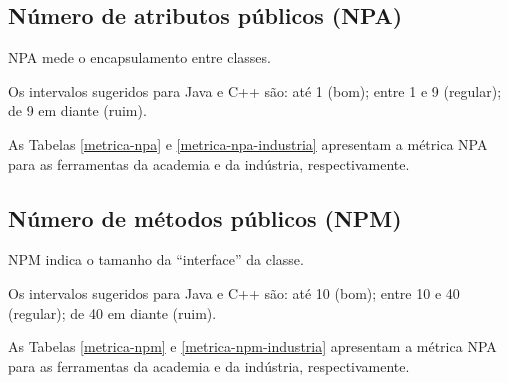 \subsection{Número de atributos públicos (NPA)}

NPA mede o encapsulamento entre classes.

Os intervalos sugeridos para Java e C++ são: até 1 (bom); entre 1 e 9
(regular); de 9 em diante (ruim).

As Tabelas \ref{metrica-npa} e \ref{metrica-npa-industria} apresentam a
métrica NPA para as ferramentas da academia e da indústria, respectivamente.



\subsection{Número de métodos públicos (NPM)}

NPM indica o tamanho da ``interface'' da classe.

Os intervalos sugeridos para Java e C++ são: até 10 (bom); entre 10 e 40
(regular); de 40 em diante (ruim).

As Tabelas \ref{metrica-npm} e \ref{metrica-npm-industria} apresentam a
métrica NPA para as ferramentas da academia e da indústria, respectivamente.



